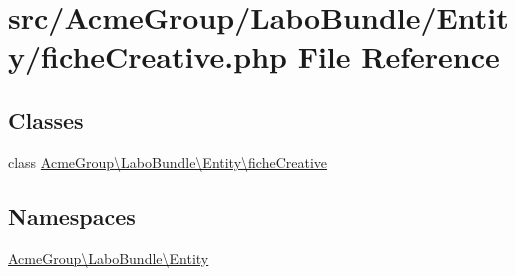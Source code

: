 \hypertarget{fiche_creative_8php}{\section{src/\+Acme\+Group/\+Labo\+Bundle/\+Entity/fiche\+Creative.php File Reference}
\label{fiche_creative_8php}
}
\subsection*{Classes}
\begin{DoxyCompactItemize}
\item 
class \hyperlink{class_acme_group_1_1_labo_bundle_1_1_entity_1_1fiche_creative}{Acme\+Group\textbackslash{}\+Labo\+Bundle\textbackslash{}\+Entity\textbackslash{}fiche\+Creative}
\end{DoxyCompactItemize}
\subsection*{Namespaces}
\begin{DoxyCompactItemize}
\item 
 \hyperlink{namespace_acme_group_1_1_labo_bundle_1_1_entity}{Acme\+Group\textbackslash{}\+Labo\+Bundle\textbackslash{}\+Entity}
\end{DoxyCompactItemize}
